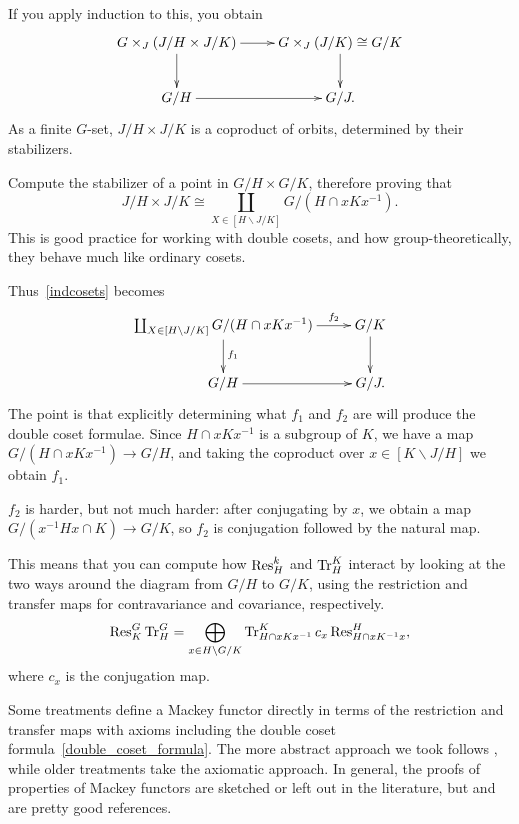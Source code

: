If you apply induction to this, you obtain
\begin{equation}
\label{indcosets}
\gathxy{
	G\times_J (J/H\times J/K)\ar[r]\ar[d] & G\times_J(J/K)\cong G/K\ar[d]\\
	G/H\ar[r] & G/J.
}
\end{equation}
As a finite $G$-set, $J/H\times J/K$ is a coproduct of orbits, determined by their stabilizers.
\begin{ex}
Compute the stabilizer of a point in $G/H\times G/K$, therefore proving that
\[J/H\times J/K\cong \coprod_{X\in[H\backslash J/K]} G/(H\cap xKx^{-1}).\]
This is good practice for working with double cosets, and how group-theoretically, they behave much like ordinary
cosets.
\end{ex}
Thus~\eqref{indcosets} becomes
\begin{equation}
\label{finalcsdiag}
\gathxy{
	\coprod_{X\in[H\backslash J/K]} G/(H\cap xKx^{-1})\ar[r]^-{f_2}\ar[d]^{f_1} & G/K\ar[d]\\
	G/H\ar[r] & G/J.
}
\end{equation}
The point is that explicitly determining what $f_1$ and $f_2$ are will produce the double coset formulae. Since
$H\cap xKx^{-1}$ is a subgroup of $K$, we have a map $G/(H\cap xKx^{-1})\to G/H$, and taking the coproduct over
$x\in[K\backslash J/H]$ we obtain $f_1$.

$f_2$ is harder, but not much harder: after conjugating by $x$, we obtain a map $G/(x^{-1}Hx\cap K)\to G/K$,
so $f_2$ is conjugation followed by the natural map.

This means that you can compute how $\operatorname{Res}_H^k$ and $\operatorname{Tr}_H^K$ interact by looking at the two ways around the
diagram from $G/H$ to $G/K$, using the restriction and transfer maps for contravariance and covariance,
respectively.
\begin{equation}
\label{double_coset_formula}
\operatorname{Res}_K^G\operatorname{Tr}_H^G = \bigoplus_{x\in H\backslash G/K} \operatorname{Tr}_{H\cap xKx^{-1}}^K c_x\operatorname{Res}_{H\cap xK^{-1}x}^H,
\end{equation}
where $c_x$ is the conjugation map.
\begin{rem}
Some treatments define a Mackey functor directly in terms of the restriction and transfer maps with axioms
including the double coset formula~\eqref{double_coset_formula}. The more abstract approach we took follows
\cite{Dress}, while older treatments take the axiomatic approach. In general, the proofs of properties of Mackey
functors are sketched or left out in the literature, but \cite{Webb} and  are pretty good
references.
\end{rem}
